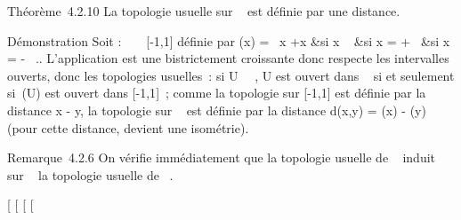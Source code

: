 \documentclass[]{article}
\begin{document}
Théorème~4.2.10 La topologie usuelle sur \overline{}~
est définie par une distance.

Démonstration Soit \phi : \overline{}~ \rightarrow~ {[}-1,1{]}
définie par \phi(x) = \left \
\cases  x +\textbar{}x\textbar{} &si x \in {}~  &si x = +\infty~
\cr -1 &si x = -\infty~ \cr 
\right .. L'application \phi est une bi\jmathection strictement
croissante donc respecte les intervalles ouverts, donc les topologies
usuelles~: si U \subset~\overline{}~, U est ouvert dans
\overline\mathbb{R}~ si et seulement si~\phi(U) est ouvert dans
{[}-1,1{]}~; comme la topologie sur {[}-1,1{]} est définie par la
distance \textbar{}x - y\textbar{}, la topologie sur
\overline{}~ est définie par la distance d(x,y) =
\textbar{}\phi(x) - \phi(y)\textbar{} (pour cette distance, \phi devient une
isométrie).

Remarque~4.2.6 On vérifie immédiatement que la topologie usuelle de
\overline{}~ induit sur ~ la topologie usuelle de \mathbb{R}~.

{[}
{[}
{[}
{[}
\end{document}
